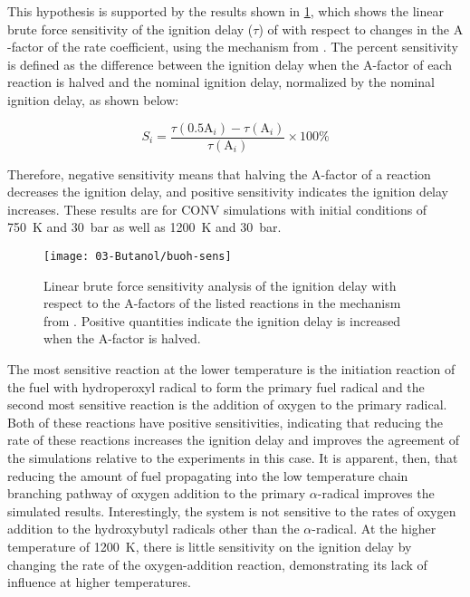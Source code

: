 \documentclass[../main.tex]{subfiles}
\begin{document}
This hypothesis is supported by the results shown in \cref{fig:buoh-sens},
which shows the linear brute force sensitivity of the ignition delay ($\tau$)
of \iBuOH{} with respect to changes in the $\mathrm{A}$-factor of the rate coefficient, using
the mechanism from \textcite{Sarathy2012}. The percent sensitivity is defined
as the difference between the ignition delay when the $\mathrm{A}$-factor of each reaction
is halved and the nominal ignition delay, normalized by the nominal ignition
delay, as shown below:

\begin{equation}
    \label{eq:buoh-sens}
    S_i=\frac{\tau(0.5\mathrm{A}_i )-\tau(\mathrm{A}_i )}{\tau(\mathrm{A}_i)} \times 100\%
\end{equation}

Therefore, negative sensitivity means that halving the $\mathrm{A}$-factor of a reaction
decreases the ignition delay, and positive sensitivity indicates the ignition
delay increases. These results are for CONV simulations with initial conditions
of \SI{750}{\kelvin} and \SI{30}{\bar} as well as \SI{1200}{\kelvin} and \SI{30}{\bar}.

\begin{figure}
    \texttt{[image: 03-Butanol/buoh-sens]}
    \caption{Linear brute force sensitivity analysis of the ignition delay with
        respect to the A-factors of the listed reactions in the mechanism from
        \textcite{Sarathy2012}. Positive quantities indicate the ignition delay
        is increased when the $\mathrm{A}$-factor is halved.}
    \label{fig:buoh-sens}
\end{figure}

The most sensitive reaction at the lower temperature is the initiation reaction
of the fuel with hydroperoxyl radical to form the primary fuel radical and the
second most sensitive reaction is the addition of oxygen to the primary
radical. Both of these reactions have positive sensitivities, indicating that
reducing the rate of these reactions increases the ignition delay
and improves the agreement of the simulations relative to the experiments
in this case. It is apparent, then, that reducing the amount of fuel
propagating into the low temperature chain branching pathway of oxygen
addition to the primary $\alpha$-radical improves the simulated results.
Interestingly, the \iBuOH{} system is not sensitive to the rates of
oxygen addition to the hydroxybutyl radicals other than the
$\alpha$-radical. At the higher temperature of \SI{1200}{\kelvin}, there
is little sensitivity on the ignition delay by changing the rate of the
oxygen-addition reaction, demonstrating its lack of influence at higher
temperatures.
\end{document}
